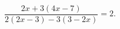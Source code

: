 \begin{ex}[type=equation]
	\begin{condition}
		$\dfrac{2x + 3(4x - 7)}{2(2x - 3)-3(3-2x)} = 2.$
	\end{condition}
\end{ex}